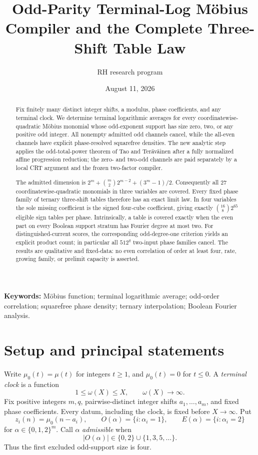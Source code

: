 \documentclass[11pt]{article}
\title{Odd-Parity Terminal-Log M\"obius Compiler and the Complete Three-Shift Table Law}
\author{RH research program}
\date{August 11, 2026}
\theoremstyle{definition}
\theoremstyle{remark}
\newcommand{\mob}{\mu}
\begin{document}
\maketitle

\begin{abstract}
Fix finitely many distinct integer shifts, a modulus, phase coefficients,
and any terminal clock.  We determine terminal logarithmic averages for
every coordinatewise-quadratic M\"obius monomial whose odd-exponent support
has size zero, two, or any positive odd integer.  All nonempty admitted odd
channels cancel, while the all-even channels have explicit phase-resolved
squarefree densities.  The new analytic step applies the odd-total-power
theorem of Tao and Ter\"av\"ainen after a fully normalized affine
progression reduction; the zero- and two-odd channels are paid separately
by a local CRT argument and the frozen two-factor compiler.

The admitted dimension is
\(2^m+\binom m2 2^{m-2}+(3^m-1)/2\).  Consequently all \(27\)
coordinatewise-quadratic monomials in three variables are covered.  Every
fixed phase family of ternary three-shift tables therefore has an exact
limit law.  In four variables the sole missing coefficient is the signed
four-cube coefficient, giving exactly
\(\binom{16}{8}2^{65}\) eligible sign tables per phase.  Intrinsically, a
table is covered exactly when the even part on every Boolean support
stratum has Fourier degree at most two.  For distinguished-current scores,
the corresponding odd-degree-one criterion yields an explicit product
count; in particular all \(512^q\) two-input phase families cancel.  The
results are qualitative and fixed-data: no even correlation of order at
least four, rate, growing family, or prelimit capacity is asserted.
\end{abstract}

\noindent\textbf{Keywords:} M\"obius function; terminal logarithmic average;
odd-order correlation; squarefree phase density; ternary interpolation;
Boolean Fourier analysis.

\section{Setup and principal statements}

Write \(\mob_0(t)=\mob(t)\) for integers \(t\geq1\), and
\(\mob_0(t)=0\) for \(t\leq0\).  A \emph{terminal clock} is a function
\begin{equation}
  1\leq\omega(X)\leq X,\qquad \omega(X)\longrightarrow\infty.
  \label{eq:clock}
\end{equation}
Fix positive integers \(m,q\), pairwise-distinct integer shifts
\(a_1,\ldots,a_m\), and fixed phase coefficients.  Every datum, including
the clock, is fixed before \(X\to\infty\).  Put
\[
 z_i(n)=\mob_0(n-a_i),\qquad
 O(\alpha)=\{i:\alpha_i=1\},\qquad
 E(\alpha)=\{i:\alpha_i=2\}
\]
for \(\alpha\in\{0,1,2\}^m\).  Call \(\alpha\) \emph{admissible} when
\begin{equation}
 |O(\alpha)|\in\{0,2\}\cup\{1,3,5,\ldots\}.
 \label{eq:admissible}
\end{equation}
Thus the first excluded odd-support size is four.
\end{document}

